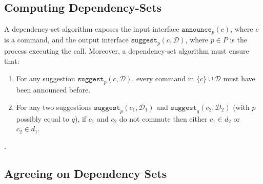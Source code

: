 \subsection{Computing Dependency-Sets}
\label{dep-algo}

A dependency-set algorithm exposes the input interface $\texttt{announce}_p\left( c \right)$, where $c$ is a command, and the output interface $\texttt{suggest}_p \left( c,\mathcal{D}\right)$, where $p\in P$ is the process executing the call.  
Moreover, a dependency-set algorithm must ensure that:
\begin{enumerate}
    \item For any suggestion $\texttt{suggest}_p \left( c,\mathcal{D}\right)$, every command in $\{c\}\cup \mathcal{D}$ must have been announced before.
    \item For any two suggestions $\texttt{suggest}_p \left( c_1,\mathcal{D}_1\right)$ and $\texttt{suggest}_q \left( c_2,\mathcal{D}_2\right)$ (with $p$ possibly equal to $q$),  if $c_1$ and $c_2$ do not commute then either $c_1\in d_2$ or $c_2 \in d_1$.
\end{enumerate}



.

\subsection{Agreeing on Dependency Sets}
\label{map-algo}

